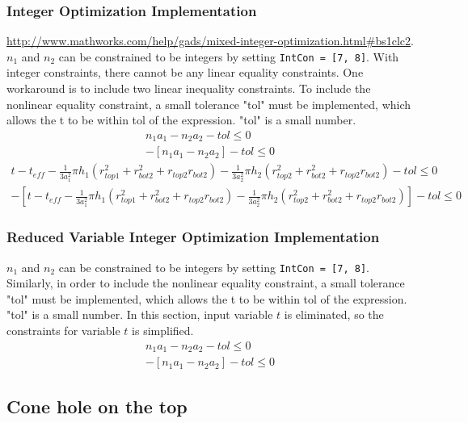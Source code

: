 \documentclass[12pt]{article}
\numberwithin{equation}{section}
\numberwithin{equation}{section}
\begin{document}
\subsubsection{Integer Optimization Implementation}
\url{http://www.mathworks.com/help/gads/mixed-integer-optimization.html#bs1clc2}.
$n_1$ and $n_2$ can be constrained to be integers by setting \texttt{IntCon = [7, 8]}.  
With integer constraints, there cannot be any linear equality constraints.  
One workaround is to include two linear inequality constraints.  
To include the nonlinear equality constraint, a small tolerance "tol" must be implemented, which allows the t to be within tol of the expression. "tol" is a small 
number.
\begin{align}
n_1 a_1 - n_2 a_2 -tol \leq 0\\
- \left [ n_1 a_1 - n_2 a_2 \right ] -tol \leq 0
\end{align}
\begin{align}
t - t_{eff} - \frac{1}{3a_1^2}\pi h_1(r_{top1}^2+r_{bot2}^2+r_{top2}r_{bot2}) - \frac{1}{3a_2^2}\pi h_2(r_{top2}^2+r_{bot2}^2+r_{top2}r_{bot2}) - tol \leq 0 \\
-\left [ t-t_{eff} - \frac{1}{3a_1^2}\pi h_1(r_{top1}^2+r_{bot2}^2+r_{top2}r_{bot2}) - \frac{1}{3a_2^2}\pi h_2(r_{top2}^2+r_{bot2}^2+r_{top2}r_{bot2}) \right ] - tol \leq 0
\end{align}

\subsubsection{Reduced Variable Integer Optimization Implementation}
$n_1$ and $n_2$ can be constrained to be integers by setting \texttt{IntCon = [7, 8]}.  
Similarly, in order to include the nonlinear equality constraint, a small tolerance "tol" must be implemented, which allows the t to be within tol of the expression. "tol" is a small number. In this section, input variable $t$ is eliminated, so the constraints for variable $t$ is simplified. 
\begin{align}
n_1 a_1 - n_2 a_2 -tol \leq 0\\
- \left [ n_1 a_1 - n_2 a_2 \right ] -tol \leq 0
\end{align}

\subsection{Cone hole on the top}
\end{document}
